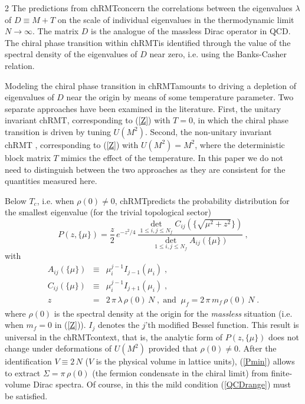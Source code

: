 \begin{multicols}{2}
The predictions from chRMT\space concern the correlations between the
eigenvalues $\lambda$ of $D\equiv M+T$ on the scale of individual  eigenvalues
in the thermodynamic limit $N\to\infty$.  The matrix $D$  is the analogue of
the massless Dirac operator in QCD.  The chiral phase transition within
chRMT\space is identified through the value of the spectral density of the
eigenvalues of $D$ near zero,  i.e. using the Banks-Casher relation.  

Modeling the chiral phase transition in chRMT\space amounts to driving a
depletion of eigenvalues of $D$ near the origin by means of some temperature
parameter.  Two separate approaches have been examined in the literature.
First, the unitary invariant chRMT\space \cite{ShVe93,AkDaMa97}, corresponding
to (\ref{Z})  with $T=0$, in which the chiral phase transition is driven by
tuning $U(M^2)$. Second, the non-unitary invariant chRMT\space
\cite{JaVe96,WeScWe96,SeWeGu98}, corresponding to (\ref{Z})  with $U(M^2)=M^2$,
where the deterministic block matrix $T$ mimics the effect of the temperature.
In this paper we do not need  to distinguish between the two approaches as they
are consistent for the quantities measured here.

Below $T_c$,  i.e. when $\rho(0)\not=0$, chRMT\space predicts \cite{NiDaWe98} 
the probability distribution for the smallest eigenvalue (for the trivial 
topological sector) 
\begin{equation}\label{Pmin}
P(z,\{\mu\})=\frac{z}{2}\,e^{-z^2/4}\,\frac{\det_{1\leq i,j\leq
    N_f}C_{ij}(\{\sqrt{\mu^2+z^2}\})}{\det_{1\leq i,j\leq
    N_f}A_{ij}(\{\mu\})} \ , 
\end{equation}
with 
\begin{eqnarray}
A_{ij}(\{\mu\})&\equiv&\mu_i^{j-1}I_{j-1}(\mu_i)\;, \nonumber\\
C_{ij}(\{\mu\})&\equiv&\mu_i^{j-1}I_{j+1}(\mu_i)\;, \nonumber\\
z&=&2\,\pi\,\lambda\,\rho(0)\,N\;, \;\textrm{and}\;\;
\mu_f=2\,\pi\,m_f\,\rho(0)\,N\;.
\end{eqnarray}
where $\rho(0)$ is the spectral density at the origin for the {\em massless}
situation (i.e. when $m_f=0$ in (\ref{Z})). $I_j$ denotes the $j$'th modified
Bessel function. This result is universal in the chRMT\space context,  that
is, the analytic form of $P(z,\{\mu\})$ does not change under deformations of
$U(M^2)$ provided that $\rho(0)\not=0$.  After the identification $V\equiv
2\,N$ ($V$ is the physical volume in lattice units),  (\ref{Pmin}) allows to
extract  $\Sigma=\pi\,\rho(0)$ (the fermion condensate in the chiral limit) 
from  finite-volume Dirac spectra. Of course, in this the mild condition
(\ref{QCDrange}) must be satisfied.


\end{multicols}

